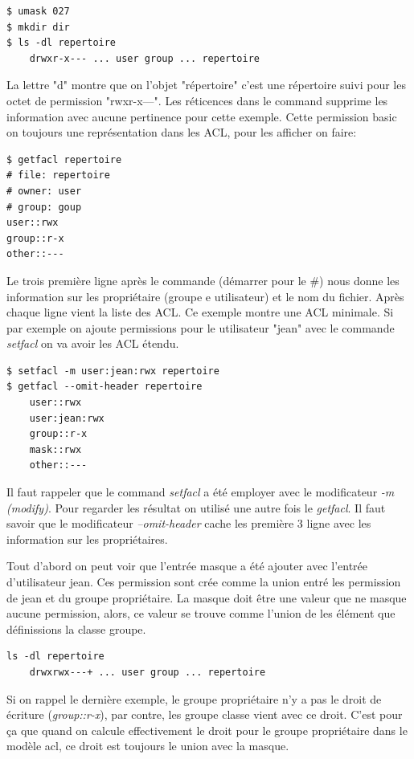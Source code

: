 \begin{verbatim}
$ umask 027 
$ mkdir dir 
$ ls -dl repertoire
	drwxr-x--- ... user group ... repertoire
\end{verbatim}

La lettre "d" montre que on l'objet "répertoire" c'est une répertoire suivi pour les octet de permission "rwxr-x---". Les réticences dans le command supprime les information avec aucune pertinence pour cette exemple. Cette permission basic on toujours une représentation dans les ACL, pour les afficher on faire:

\begin{verbatim}
$ getfacl repertoire
# file: repertoire 
# owner: user 
# group: goup
user::rwx
group::r-x
other::---
\end{verbatim}

Le trois première ligne après le commande (démarrer pour le \#) nous donne les information sur les propriétaire (groupe e utilisateur) et le nom du fichier. Après chaque ligne vient la liste des ACL. Ce exemple montre une ACL minimale. Si par exemple on ajoute permissions pour le utilisateur "jean" avec le commande \emph{setfacl} on va avoir les ACL étendu.

\begin{verbatim}
$ setfacl -m user:jean:rwx repertoire
$ getfacl --omit-header repertoire 
	user::rwx 
	user:jean:rwx	
	group::r-x 
	mask::rwx 
	other::---
\end{verbatim}

Il faut rappeler que le command \emph{setfacl} a été employer avec le modificateur \emph{-m (modify)}. Pour regarder les résultat on utilisé une autre fois le \emph{getfacl}. Il faut savoir que le modificateur \emph{--omit-header} cache les première 3 ligne avec les information sur les propriétaires.  

Tout d'abord on peut voir que l'entrée masque a été ajouter avec l'entrée d'utilisateur jean. Ces permission sont crée comme la union entré les permission de jean et du groupe propriétaire. La masque doit être une valeur que ne masque aucune permission, alors, ce valeur se trouve comme l'union de les élément que définissions la classe groupe.  

\begin{verbatim}
ls -dl repertoire
	drwxrwx---+ ... user group ... repertoire
\end{verbatim}

Si on rappel le dernière exemple, le groupe propriétaire n'y a pas le droit de écriture (\emph{group::r-x}), par contre, les groupe classe vient avec ce droit. C'est pour ça que quand on calcule effectivement le droit pour le groupe propriétaire dans le modèle acl, ce droit est toujours le union avec la masque.

